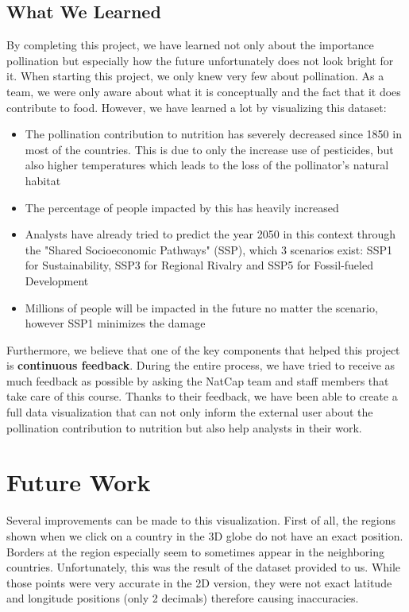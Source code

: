 \documentclass[12pt]{article}
\begin{document}
\subsection{What We Learned}
By completing this project, we have learned not only about the importance pollination but especially how the future unfortunately does not look bright for it. When starting this project, we only knew very few about pollination. As a team, we were only aware about what it is conceptually and the fact that it does contribute to food. \newline
However, we have learned a lot by visualizing this dataset:
\begin{itemize}
    \item The pollination contribution to nutrition has severely decreased since 1850 in most of the countries. This is due to only the increase use of pesticides, but also higher temperatures which leads to the loss of the pollinator's natural habitat
    \item The percentage of people impacted by this has heavily increased
    \item Analysts have already tried to predict the year 2050 in this context through the "Shared Socioeconomic Pathways" (SSP), which 3 scenarios exist: SSP1 for Sustainability, SSP3 for Regional Rivalry and SSP5 for Fossil-fueled Development
    \item Millions of people will be impacted in the future no matter the scenario, however SSP1 minimizes the damage
\end{itemize}
Furthermore, we believe that one of the key components that helped this project is \textbf{continuous feedback}. During the entire process, we have tried to receive as much feedback as possible by asking the NatCap team and staff members that take care of this course. Thanks to their feedback, we have been able to create a full data visualization that can not only inform the external user about the pollination contribution to nutrition but also help analysts in their work.
\section{Future Work}
Several improvements can be made to this visualization. First of all, the regions shown when we click on a country in the 3D globe do not have an exact position. Borders at the region especially seem to sometimes appear in the neighboring countries. Unfortunately, this was the result of the dataset provided to us. While those points were very accurate in the 2D version, they were not exact latitude and longitude positions (only 2 decimals) therefore causing inaccuracies. \newline
\end{document}

